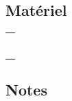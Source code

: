 \documentclass{report}
\begin{document}
\subsection*{Matériel}
\begin{tabular}{c}
     \\ \\ \\ \\ \\ \\ \\ \\
\end{tabular}

\noindent\makebox[\linewidth]{\rule{\textwidth}{0.4pt}}


\subsection*{Notes}
\rmfamily
\end{document}

